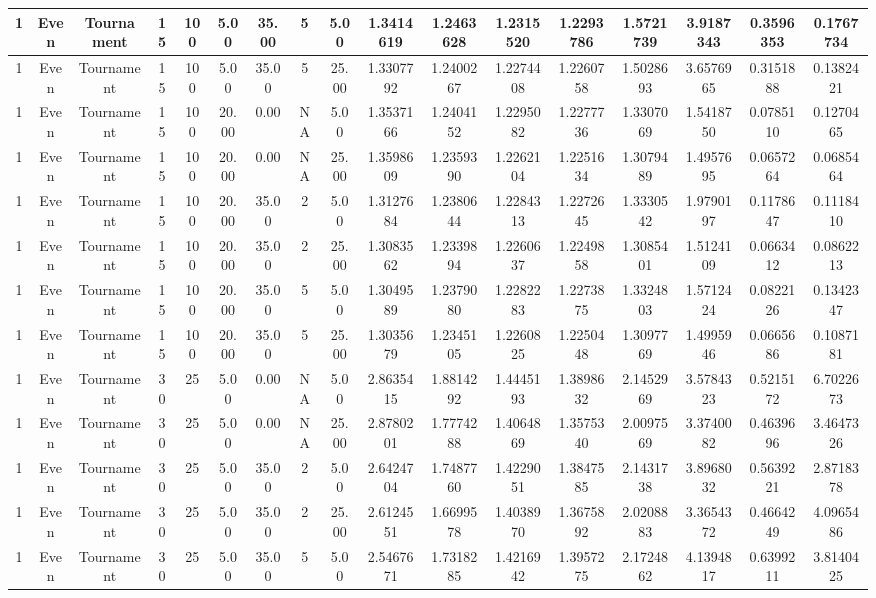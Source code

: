 \begin{longtable}{ | c | c | c | c | c | c | c | c | c | c | c | c | c | c | c | c | c | }
	\hline
	1	&	Even	&	Tournament	&	15	&	100	&	5.00	&	35.00	&	5	&	5.00	&	1.3414619	&	1.2463628	&	1.2315520	&	1.2293786	&	1.5721739	&	3.9187343	&	0.3596353	&	0.1767734 \\
	\hline
	1	&	Even	&	Tournament	&	15	&	100	&	5.00	&	35.00	&	5	&	25.00	&	1.3307792	&	1.2400267	&	1.2274408	&	1.2260758	&	1.5028693	&	3.6576965	&	0.3151888	&	0.1382421 \\
	\hline
	1	&	Even	&	Tournament	&	15	&	100	&	20.00	&	0.00	&	NA	&	5.00	&	1.3537166	&	1.2404152	&	1.2295082	&	1.2277736	&	1.3307069	&	1.5418750	&	0.0785110	&	0.1270465 \\
	\hline
	1	&	Even	&	Tournament	&	15	&	100	&	20.00	&	0.00	&	NA	&	25.00	&	1.3598609	&	1.2359390	&	1.2262104	&	1.2251634	&	1.3079489	&	1.4957695	&	0.0657264	&	0.0685464 \\
	\hline
	1	&	Even	&	Tournament	&	15	&	100	&	20.00	&	35.00	&	2	&	5.00	&	1.3127684	&	1.2380644	&	1.2284313	&	1.2272645	&	1.3330542	&	1.9790197	&	0.1178647	&	0.1118410 \\
	\hline
	1	&	Even	&	Tournament	&	15	&	100	&	20.00	&	35.00	&	2	&	25.00	&	1.3083562	&	1.2339894	&	1.2260637	&	1.2249858	&	1.3085401	&	1.5124109	&	0.0663412	&	0.0862213 \\
	\hline
	1	&	Even	&	Tournament	&	15	&	100	&	20.00	&	35.00	&	5	&	5.00	&	1.3049589	&	1.2379080	&	1.2282283	&	1.2273875	&	1.3324803	&	1.5712424	&	0.0822126	&	0.1342347 \\
	\hline
	1	&	Even	&	Tournament	&	15	&	100	&	20.00	&	35.00	&	5	&	25.00	&	1.3035679	&	1.2345105	&	1.2260825	&	1.2250448	&	1.3097769	&	1.4995946	&	0.0665686	&	0.1087181 \\
	\hline
	1	&	Even	&	Tournament	&	30	&	25	&	5.00	&	0.00	&	NA	&	5.00	&	2.8635415	&	1.8814292	&	1.4445193	&	1.3898632	&	2.1452969	&	3.5784323	&	0.5215172	&	6.7022673 \\
	\hline
	1	&	Even	&	Tournament	&	30	&	25	&	5.00	&	0.00	&	NA	&	25.00	&	2.8780201	&	1.7774288	&	1.4064869	&	1.3575340	&	2.0097569	&	3.3740082	&	0.4639696	&	3.4647326 \\
	\hline
	1	&	Even	&	Tournament	&	30	&	25	&	5.00	&	35.00	&	2	&	5.00	&	2.6424704	&	1.7487760	&	1.4229051	&	1.3847585	&	2.1431738	&	3.8968032	&	0.5639221	&	2.8718378 \\
	\hline
	1	&	Even	&	Tournament	&	30	&	25	&	5.00	&	35.00	&	2	&	25.00	&	2.6124551	&	1.6699578	&	1.4038970	&	1.3675892	&	2.0208883	&	3.3654372	&	0.4664249	&	4.0965486 \\
	\hline
	1	&	Even	&	Tournament	&	30	&	25	&	5.00	&	35.00	&	5	&	5.00	&	2.5467671	&	1.7318285	&	1.4216942	&	1.3957275	&	2.1724862	&	4.1394817	&	0.6399211	&	3.8140425 \\

\end{longtable}
